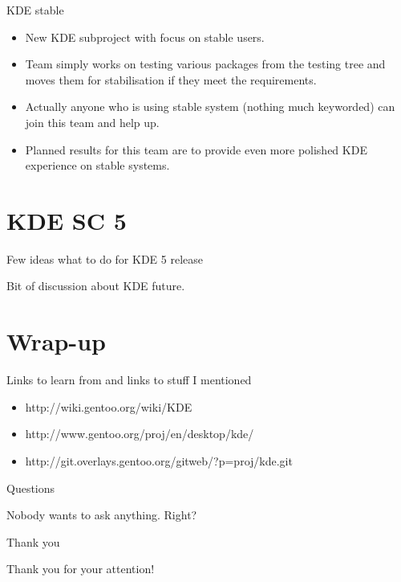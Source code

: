 \documentclass{beamer}
\begin{document}
\begin{frame}{KDE stable}
	\begin{itemize}
		\item New KDE subproject with focus on stable users.
		\item Team simply works on testing various packages from the testing tree and moves them for stabilisation if they meet the requirements.
		\item Actually anyone who is using stable system (nothing much keyworded) can join this team and help up.
		\item Planned results for this team are to provide even more polished KDE experience on stable systems.
	\end{itemize}
\end{frame}

\section{KDE SC 5}
\begin{frame}{Few ideas what to do for KDE 5 release}
	\begin{center}Bit of discussion about KDE future.\end{center}
\end{frame}

\section{Wrap-up}

\begin{frame}{Links to learn from and links to stuff I mentioned}
	\begin{itemize}
		\item http://wiki.gentoo.org/wiki/KDE
		\item http://www.gentoo.org/proj/en/desktop/kde/
		\item http://git.overlays.gentoo.org/gitweb/?p=proj/kde.git
	\end{itemize}
\end{frame}

\begin{frame}{Questions}
	\begin{center}Nobody wants to ask anything. Right?\end{center}
\end{frame}

\begin{frame}{Thank you}
	\begin{center}Thank you for your attention!\end{center}
\end{frame}
\end{document}
